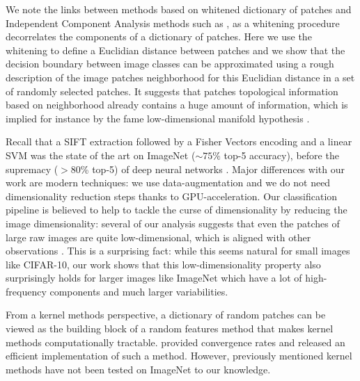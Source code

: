 \documentclass{article} %
\begin{document}
We  note the links between methods based on whitened dictionary of patches and Independent Component Analysis methods such as \citep{ngiam2010tiled}, as a whitening procedure decorrelates the components of a dictionary of patches.
Here we use the whitening to define a Euclidian distance between patches and we show that the decision boundary between image classes can be approximated using a rough description of the image patches neighborhood for this Euclidian distance in a set of randomly selected patches.
It suggests that patches topological information based on neighborhood already contains a huge amount of information, which is implied for instance by the fame low-dimensional manifold hypothesis 
\citep{fefferman2016testing}.

Recall that a SIFT extraction \cite{lowe2004distinctive} followed by a Fisher Vectors encoding \citep{sanchez2013image} and a linear SVM was the state of the art on ImageNet ($\sim 75\% $ top-5 accuracy), before the supremacy ($ > 80$\% top-5) of deep neural networks \citet{krizhevsky2012imagenet}.
Major differences with our work are modern techniques: we use data-augmentation and we do not need dimensionality reduction steps thanks to GPU-acceleration.
Our classification pipeline is believed to help to tackle the curse of dimensionality by reducing the image dimensionality: several of our analysis  suggests that even the patches of large raw images are quite low-dimensional, which is aligned with other observations \citep{Oyallon_2017_CVPR}.
This is a surprising fact: while this seems natural for small  images like CIFAR-10, our work shows that this low-dimensionality property also surprisingly holds for larger images like ImageNet which have a lot of high-frequency components and much larger variabilities.

From a kernel methods perspective, a dictionary of random patches can be viewed as the building block of a random features method \citep{rahimi2008random} that makes kernel methods computationally tractable.
\cite{rudi2017falkon} provided convergence rates and released an efficient implementation of such a method.
However, previously mentioned kernel methods \citep{mairal2016end,li2019enhanced,shankar2020neural} have not been tested on ImageNet to our knowledge.
\end{document}
